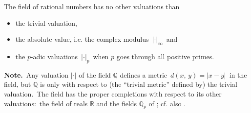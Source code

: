 \documentclass[12pt]{article}
\begin{document}
The field of rational numbers has no other  valuations than
\begin{itemize}
 \item the trivial valuation,
 \item the absolute value, i.e. the complex modulus \,$|\cdot|_\infty$\, and 
 \item the $p$-adic valuations \,$|\cdot|_p$\, when $p$ goes through all positive primes.
\end{itemize}

\textbf{Note.} \,Any valuation $|\cdot|$ of the field $\mathbb{Q}$ defines a metric \,$d(x,\,y) = |x-y|$\, in the field, but $\mathbb{Q}$ is  only with respect to (the ``trivial metric'' defined by) the trivial valuation. \,The field has the proper completions with respect to its other valuations: \,the field of reals $\mathbb{R}$ and the fields $\mathbb{Q}_p$ of ; cf. also .
\end{document}
